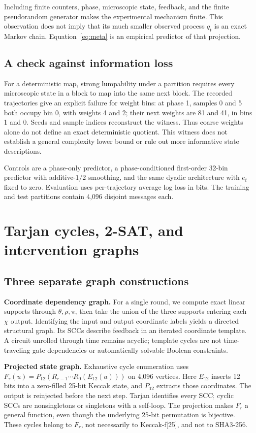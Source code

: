 \documentclass[11pt]{article}
\begin{document}
Including finite counters, phase, microscopic state, feedback, and the finite pseudorandom generator makes the experimental mechanism finite. This observation does not imply that its much smaller observed process $q_t$ is an exact Markov chain. Equation~\eqref{eq:meta} is an empirical predictor of that projection.

\subsection{A check against information loss}

For a deterministic map, strong lumpability under a partition requires every microscopic state in a block to map into the same next block. The recorded trajectories give an explicit failure for weight bins: at phase 1, samples 0 and 5 both occupy bin 0, with weights 4 and 2; their next weights are 81 and 41, in bins 1 and 0. Seeds and sample indices reconstruct the witness. Thus coarse weights alone do not define an exact deterministic quotient. This witness does not establish a general complexity lower bound or rule out more informative state descriptions.

Controls are a phase-only predictor, a phase-conditioned first-order 32-bin predictor with additive-$1/2$ smoothing, and the same dyadic architecture with $e_t$ fixed to zero. Evaluation uses per-trajectory average log loss in bits. The training and test partitions contain 4,096 disjoint messages each.

\section{Tarjan cycles, 2-SAT, and intervention graphs}

\subsection{Three separate graph constructions}

\textbf{Coordinate dependency graph.} For a single round, we compute exact linear supports through $\theta,\rho,\pi$, then take the union of the three supports entering each $\chi$ output. Identifying the input and output coordinate labels yields a directed structural graph. Its SCCs describe feedback in an iterated coordinate template. A circuit unrolled through time remains acyclic; template cycles are not time-traveling gate dependencies or automatically solvable Boolean constraints.

\textbf{Projected state graph.} Exhaustive cycle enumeration uses $F_r(u)=P_{12}(R_{r-1}\cdots R_0(E_{12}(u)))$ on 4,096 vertices. Here $E_{12}$ inserts 12 bits into a zero-filled 25-bit Keccak state, and $P_{12}$ extracts those coordinates. The output is reinjected before the next step. Tarjan identifies every SCC; cyclic SCCs are nonsingletons or singletons with a self-loop. The projection makes $F_r$ a general function, even though the underlying 25-bit permutation is bijective. These cycles belong to $F_r$, not necessarily to Keccak-f[25], and not to SHA3-256.
\end{document}
